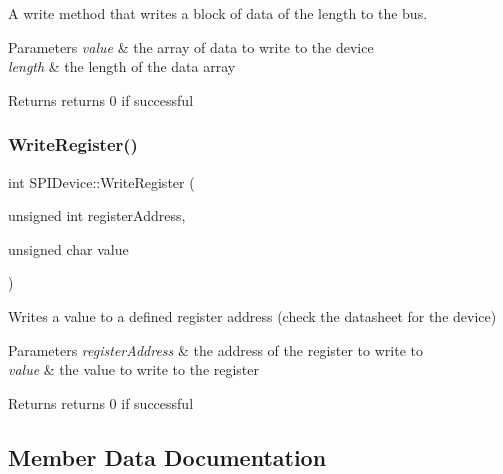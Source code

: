 A write method that writes a block of data of the length to the bus. 
\begin{DoxyParams}{Parameters}
{\em value} & the array of data to write to the device \\
\hline
{\em length} & the length of the data array \\
\hline
\end{DoxyParams}
\begin{DoxyReturn}{Returns}
returns 0 if successful 
\end{DoxyReturn}
\mbox{\label{classcubesat_1_1SPIDevice_a97694ab1aef2ec463dcd24001eb513eb}} 
\subsubsection{\texorpdfstring{Write\+Register()}{WriteRegister()}}
{\footnotesize\ttfamily int S\+P\+I\+Device\+::\+Write\+Register (\begin{DoxyParamCaption}\item[{unsigned int}]{register\+Address,  }\item[{unsigned char}]{value }\end{DoxyParamCaption})\hspace{0.3cm}{\ttfamily [virtual]}}

Writes a value to a defined register address (check the datasheet for the device) 
\begin{DoxyParams}{Parameters}
{\em register\+Address} & the address of the register to write to \\
\hline
{\em value} & the value to write to the register \\
\hline
\end{DoxyParams}
\begin{DoxyReturn}{Returns}
returns 0 if successful 
\end{DoxyReturn}


\subsection{Member Data Documentation}
\mbox{\label{classcubesat_1_1SPIDevice_a90b0ab01b41ee231ae0b76327626ad94}} 
